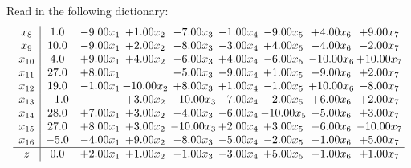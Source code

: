 \documentclass[9pt]{article}
\begin{document}
Read in the following dictionary:
\[\begin{array}{c| c c@{\hskip 2pt} c@{\hskip 2pt} c@{\hskip 2pt} c@{\hskip 2pt} c@{\hskip 2pt} c@{\hskip 2pt} c@{\hskip 2pt} }
 x_{8}   &  1.0 & -9.00 x_{1} & +  1.00 x_{2} & -7.00 x_{3} & -1.00 x_{4} & -9.00 x_{5} & +  4.00 x_{6} & +  9.00 x_{7}\\
 x_{9}   &  10.0 & -9.00 x_{1} & +  2.00 x_{2} & -8.00 x_{3} & -3.00 x_{4} & +  4.00 x_{5} & -4.00 x_{6} & -2.00 x_{7}\\
 x_{10}   &  4.0 & +  9.00 x_{1} & +  4.00 x_{2} & -6.00 x_{3} & +  4.00 x_{4} & -6.00 x_{5} & -10.00 x_{6} & + 10.00 x_{7}\\
 x_{11}   &  27.0 & +  8.00 x_{1} &   & -5.00 x_{3} & -9.00 x_{4} & +  1.00 x_{5} & -9.00 x_{6} & +  2.00 x_{7}\\
 x_{12}   &  19.0 & -1.00 x_{1} & -10.00 x_{2} & +  8.00 x_{3} & +  1.00 x_{4} & -1.00 x_{5} & + 10.00 x_{6} & -8.00 x_{7}\\
 x_{13}   &  -1.0  &   & +  3.00 x_{2} & -10.00 x_{3} & -7.00 x_{4} & -2.00 x_{5} & +  6.00 x_{6} & +  2.00 x_{7}\\
 x_{14}   &  28.0 & +  7.00 x_{1} & +  3.00 x_{2} & -4.00 x_{3} & -6.00 x_{4} & -10.00 x_{5} & -5.00 x_{6} & +  3.00 x_{7}\\
 x_{15}   &  27.0 & +  8.00 x_{1} & +  3.00 x_{2} & -10.00 x_{3} & +  2.00 x_{4} & +  3.00 x_{5} & -6.00 x_{6} & -10.00 x_{7}\\
 x_{16}   &  -5.0 & -4.00 x_{1} & +  9.00 x_{2} & -8.00 x_{3} & -5.00 x_{4} & -2.00 x_{5} & -1.00 x_{6} & +  5.00 x_{7}\\
\hline
z    &  0.0 & +  2.00 x_{1} & +  1.00 x_{2} & -1.00 x_{3} & -3.00 x_{4} & +  5.00 x_{5} & -1.00 x_{6} & +  1.00 x_{7}\\
\end{array}\]
\end{document}
